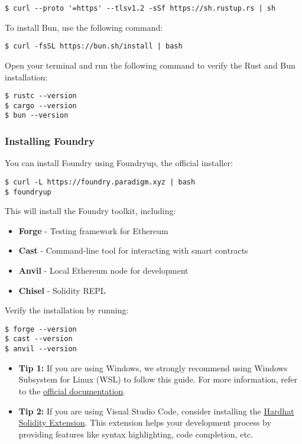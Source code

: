 \documentclass[12pt]{article}
\begin{document}
\begin{verbatim}
$ curl --proto '=https' --tlsv1.2 -sSf https://sh.rustup.rs | sh
\end{verbatim}

\noindent
To install Bun, use the following command:
\begin{verbatim}
$ curl -fsSL https://bun.sh/install | bash
\end{verbatim}

\noindent
Open your terminal and run the following command to verify the Rust and Bun installation:

\begin{verbatim}
$ rustc --version
$ cargo --version
$ bun --version
\end{verbatim}

\subsubsection*{Installing Foundry}
You can install Foundry using Foundryup, the official installer:

\begin{verbatim}
$ curl -L https://foundry.paradigm.xyz | bash
$ foundryup
\end{verbatim}

\noindent
This will install the Foundry toolkit, including:
\begin{itemize}
    \item \textbf{Forge} - Testing framework for Ethereum
    \item \textbf{Cast} - Command-line tool for interacting with smart contracts
    \item \textbf{Anvil} - Local Ethereum node for development
    \item \textbf{Chisel} - Solidity REPL
\end{itemize}

Verify the installation by running:

\begin{verbatim}
$ forge --version
$ cast --version
$ anvil --version
\end{verbatim}

\begin{itemize}
    \item \textbf{Tip 1:} If you are using Windows, we strongly recommend using Windows Subsystem for Linux (WSL) to follow this guide. For more information, refer to the \href{https://learn.microsoft.com/en-us/windows/wsl/about}{official documentation}.
    
    \item \textbf{Tip 2:} If you are using Visual Studio Code, consider installing the \href{https://marketplace.visualstudio.com/items?itemName=NomicFoundation.hardhat-solidity}{Hardhat Solidity Extension}. This extension helps your development process by providing features like syntax highlighting, code completion, etc.
\end{itemize}
\end{document}
